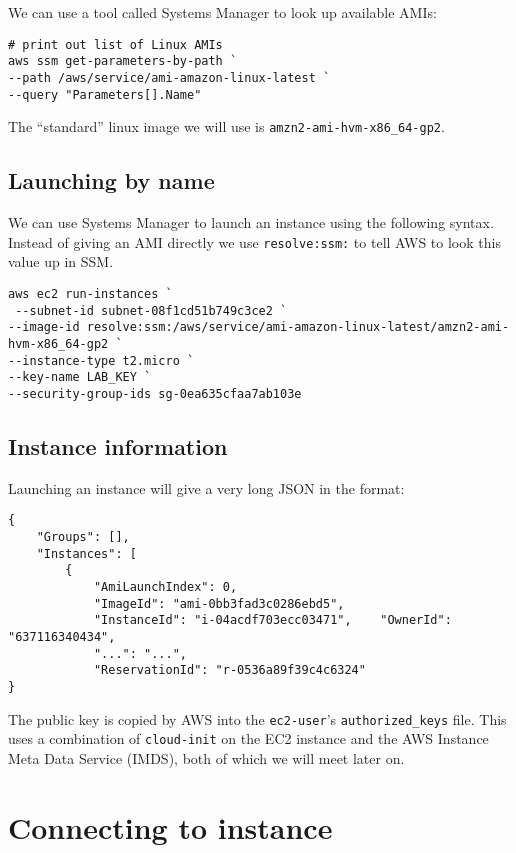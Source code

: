 \documentclass{pgnotes}
\begin{document}
We can use a tool called Systems Manager to look up available AMIs:

\begin{verbatim}
# print out list of Linux AMIs
aws ssm get-parameters-by-path `
--path /aws/service/ami-amazon-linux-latest `
--query "Parameters[].Name"
\end{verbatim}
The ``standard'' linux image we will use is \texttt{amzn2-ami-hvm-x86\_64-gp2}.

\subsection{Launching by name}

We can use Systems Manager to launch an instance using the following syntax.
Instead of giving an AMI directly we use \texttt{resolve:ssm:} to tell AWS to look this value up in SSM. 
\begin{verbatim}
aws ec2 run-instances `
 --subnet-id subnet-08f1cd51b749c3ce2 `
--image-id resolve:ssm:/aws/service/ami-amazon-linux-latest/amzn2-ami-hvm-x86_64-gp2 `
--instance-type t2.micro `
--key-name LAB_KEY `
--security-group-ids sg-0ea635cfaa7ab103e

\end{verbatim}

\subsection{Instance information}

Launching an instance will give a very long JSON in the format:

\begin{verbatim}
{
    "Groups": [],
    "Instances": [
        {
            "AmiLaunchIndex": 0,
            "ImageId": "ami-0bb3fad3c0286ebd5",
            "InstanceId": "i-04acdf703ecc03471",    "OwnerId": "637116340434",
            "...": "...",
            "ReservationId": "r-0536a89f39c4c6324"
}
\end{verbatim}

The public key is copied by AWS into the \texttt{ec2-user}'s \texttt{authorized\_keys} file.
This uses a combination of \texttt{cloud-init} on the EC2 instance and the AWS Instance Meta Data Service (IMDS), both of which we will meet later on.

\section{Connecting to instance}
\label{sec:connecting-to-instance}
\end{document}
